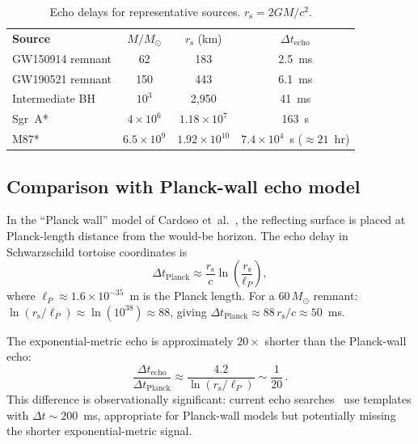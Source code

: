\documentclass[aps,prd,preprint,superscriptaddress,longbibliography]{revtex4-2}
\newcommand{\rs}{r_{\mathrm{s}}}
\begin{document}
\begin{table}[h]
\caption{\label{tab:echo_detail}Echo delays for representative sources.
$\rs = 2GM/c^2$.}
\begin{ruledtabular}
\begin{tabular}{lccc}
  \textbf{Source} & $M/M_\odot$ & $\rs$ (km)
    & $\Delta t_{\mathrm{echo}}$ \\
  \colrule
  GW150914 remnant & 62 & 183
    & 2.5~ms \\
  GW190521 remnant & 150 & 443
    & 6.1~ms \\
  Intermediate BH & $10^3$ & 2,950
    & 41~ms \\
  Sgr~A* & $4\times10^6$ & $1.18\times10^7$
    & 163~s \\
  M87* & $6.5\times10^9$ & $1.92\times10^{10}$
    & $7.4\times10^4$~s ($\approx 21$~hr)\\
\end{tabular}
\end{ruledtabular}
\end{table}

\subsection{Comparison with Planck-wall echo model}

In the ``Planck wall'' model of Cardoso et~al.~\cite{Cardoso2016},
the reflecting surface is placed at Planck-length distance from
the would-be horizon.  The echo delay in Schwarzschild tortoise
coordinates is
\begin{equation}
  \Delta t_{\mathrm{Planck}} \approx \frac{\rs}{c}
  \ln\!\left(\frac{\rs}{\ell_P}\right),
  \label{eq:echo_Planck}
\end{equation}
where $\ell_P \approx 1.6\times 10^{-35}$~m is the Planck length.
For a $60\,M_\odot$ remnant:
$\ln(\rs/\ell_P) \approx \ln(10^{38}) \approx 88$, giving
$\Delta t_{\mathrm{Planck}} \approx 88\,\rs/c \approx 50$~ms.

The exponential-metric echo is approximately $20\times$ shorter
than the Planck-wall echo:
\begin{equation}
  \frac{\Delta t_{\mathrm{echo}}}{\Delta t_{\mathrm{Planck}}}
  \approx \frac{4.2}{\ln(\rs/\ell_P)} \sim \frac{1}{20}\,.
  \label{eq:ratio_echo}
\end{equation}
This difference is observationally significant: current echo
searches~\cite{Abedi2017} use templates with $\Delta t \sim 200$~ms,
appropriate for Planck-wall models but potentially missing the
shorter exponential-metric signal.
\end{document}
